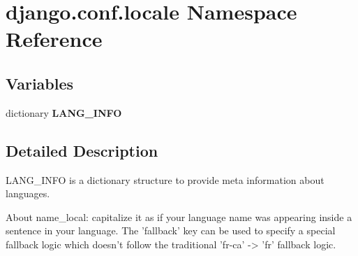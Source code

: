 \hypertarget{namespacedjango_1_1conf_1_1locale}{}\section{django.\+conf.\+locale Namespace Reference}
\label{namespacedjango_1_1conf_1_1locale}
\subsection*{Variables}
\begin{DoxyCompactItemize}
\item 
\mbox{\label{namespacedjango_1_1conf_1_1locale_a7d226932a545e53657a27299d1b21aa3}} 
dictionary {\bfseries L\+A\+N\+G\+\_\+\+I\+N\+FO}
\end{DoxyCompactItemize}


\subsection{Detailed Description}
\begin{DoxyVerb}LANG_INFO is a dictionary structure to provide meta information about languages.

About name_local: capitalize it as if your language name was appearing
inside a sentence in your language.
The 'fallback' key can be used to specify a special fallback logic which doesn't
follow the traditional 'fr-ca' -> 'fr' fallback logic.
\end{DoxyVerb}
 